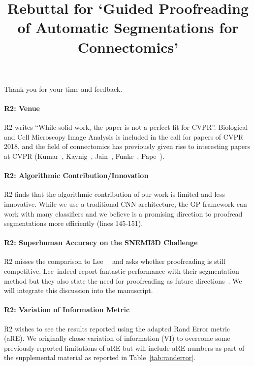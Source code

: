 \documentclass[10pt,twocolumn,letterpaper]{article}
\begin{document}
\title{Rebuttal for `Guided Proofreading of Automatic Segmentations for Connectomics'}  %

\maketitle
\thispagestyle{empty}

Thank you for your time and feedback.

\paragraph{R2: Venue} R2 writes ``While solid work, the paper is not a perfect fit for CVPR''. Biological and Cell Microscopy Image Analysis is included in the call for papers of CVPR 2018, and the field of connectomics has previously given rise to interesting papers at CVPR (Kumar~, Kaynig~, Jain~, Funke~, Pape~). %

\paragraph{R2: Algorithmic Contribution/Innovation} R2 finds that the algorithmic contribution of our work is limited and less innovative. While we use a traditional CNN architecture, the GP framework can work with many classifiers and we believe is a promising direction to proofread segmentations more efficiently (lines 145-151).

\paragraph{R2: Superhuman Accuracy on the SNEMI3D Challenge} R2 misses the comparison to Lee~\etal~\cite{superhuman_performance} and asks whether proofreading is still competitive. Lee~\etal indeed report fantastic performance with their segmentation method but they also state the need for proofreading as future directions~\cite[sec. 8.2]{superhuman_performance}. We will integrate this discussion into the manuscript.

\paragraph{R2: Variation of Information Metric} R2 wishes to see the results reported using the adapted Rand Error metric (aRE). We originally chose variation of information (VI) to overcome some previously reported limitations of aRE \cite[p. 5]{NunezIglesias2013Machine} but will include aRE numbers as part of the supplemental material as reported in Table~\ref{tab:randerror}.
\end{document}
